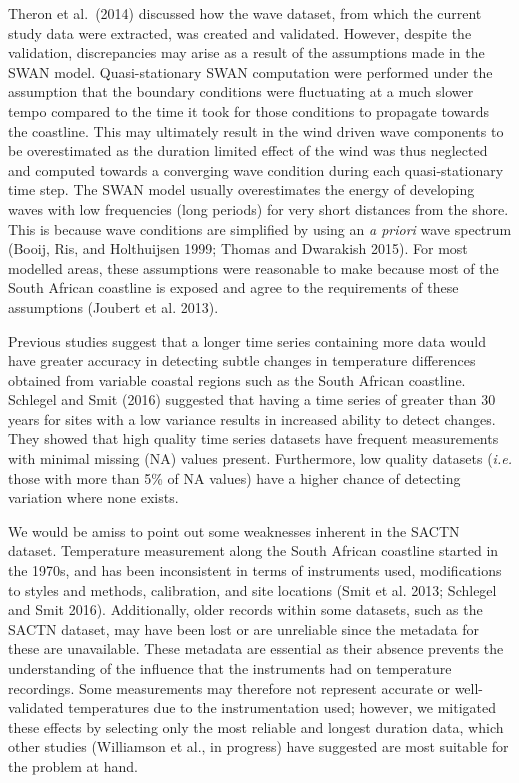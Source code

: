 \documentclass[10pt,a4paper,]{article}
\begin{document}
Theron et al.~(2014) discussed how the wave dataset, from which the
current study data were extracted, was created and validated. However,
despite the validation, discrepancies may arise as a result of the
assumptions made in the SWAN model. Quasi-stationary SWAN computation
were performed under the assumption that the boundary conditions were
fluctuating at a much slower tempo compared to the time it took for
those conditions to propagate towards the coastline. This may ultimately
result in the wind driven wave components to be overestimated as the
duration limited effect of the wind was thus neglected and computed
towards a converging wave condition during each quasi-stationary time
step. The SWAN model usually overestimates the energy of developing
waves with low frequencies (long periods) for very short distances from
the shore. This is because wave conditions are simplified by using an
\emph{a priori} wave spectrum (Booij, Ris, and Holthuijsen 1999; Thomas
and Dwarakish 2015). For most modelled areas, these assumptions were
reasonable to make because most of the South African coastline is
exposed and agree to the requirements of these assumptions (Joubert et
al. 2013).

Previous studies suggest that a longer time series containing more data
would have greater accuracy in detecting subtle changes in temperature
differences obtained from variable coastal regions such as the South
African coastline. Schlegel and Smit (2016) suggested that having a time
series of greater than 30 years for sites with a low variance results in
increased ability to detect changes. They showed that high quality time
series datasets have frequent measurements with minimal missing (NA)
values present. Furthermore, low quality datasets (\emph{i.e.} those
with more than 5\% of NA values) have a higher chance of detecting
variation where none exists.

We would be amiss to point out some weaknesses inherent in the SACTN
dataset. Temperature measurement along the South African coastline
started in the 1970s, and has been inconsistent in terms of instruments
used, modifications to styles and methods, calibration, and site
locations (Smit et al. 2013; Schlegel and Smit 2016). Additionally,
older records within some datasets, such as the SACTN dataset, may have
been lost or are unreliable since the metadata for these are
unavailable. These metadata are essential as their absence prevents the
understanding of the influence that the instruments had on temperature
recordings. Some measurements may therefore not represent accurate or
well-validated temperatures due to the instrumentation used; however, we
mitigated these effects by selecting only the most reliable and longest
duration data, which other studies (Williamson et al., in progress) have
suggested are most suitable for the problem at hand.
\end{document}
